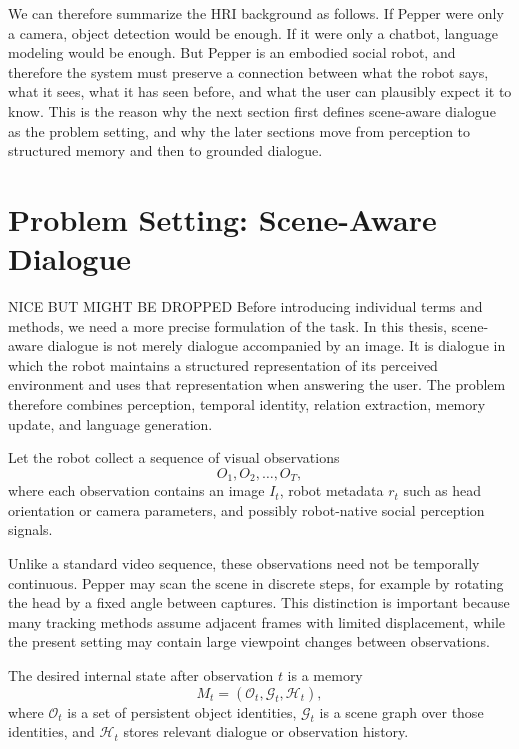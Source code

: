   We can therefore summarize the HRI background as follows. If Pepper were only a camera, object detection would be enough. If it were only a chatbot, language modeling would be enough. But Pepper is an
  embodied social robot, and therefore the system must preserve a connection between what the robot says, what it sees, what it has seen before, and what the user can plausibly expect it to know. This is
  the reason why the next section first defines scene-aware dialogue as the problem setting, and why the later sections move from perception to structured memory and then to grounded dialogue.

\section{Problem Setting: Scene-Aware Dialogue}\label{sec:problem-setting-scene-aware-dialogue}
NICE BUT MIGHT BE DROPPED
Before introducing individual terms and methods, we need a more precise formulation of the task. In this thesis, scene-aware dialogue is not merely dialogue accompanied by an image. It is dialogue in which the robot maintains a structured representation of its perceived environment and uses that representation when answering the user. The problem therefore combines perception, temporal identity, relation extraction, memory update, and language generation.

Let the robot collect a sequence of visual observations
\[
O_1,O_2,\ldots,O_T,
\]
where each observation contains an image \(I_t\), robot metadata \(r_t\) such as head orientation or camera parameters, and possibly robot-native social perception signals.

Unlike a standard video sequence, these observations need not be temporally continuous. Pepper may scan the scene in discrete steps, for example by rotating the head by a fixed angle between captures. This distinction is important because many tracking methods assume adjacent frames with limited displacement, while the present setting may contain large viewpoint changes between observations.

The desired internal state after observation \(t\) is a memory
\[
M_t=(\mathcal{O}_t,\mathcal{G}_t,\mathcal{H}_t),
\]
where \(\mathcal{O}_t\) is a set of persistent object identities, \(\mathcal{G}_t\) is a scene graph over those identities, and \(\mathcal{H}_t\) stores relevant dialogue or observation history.

